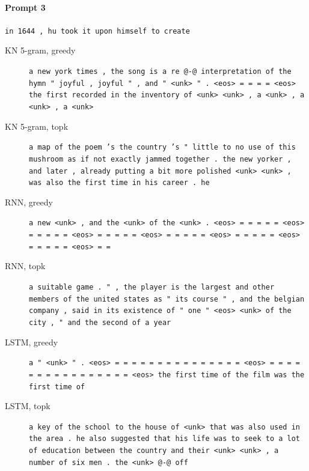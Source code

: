 \paragraph{Prompt 3} \texttt{in 1644 , hu took it upon himself to create}
\begin{description}
\item[KN 5-gram, greedy] \texttt{\small a new york times , the song is a re @-@ interpretation of the hymn " joyful , joyful " , and " \textless{}unk\textgreater{} " . \textless{}eos\textgreater{} = = = = \textless{}eos\textgreater{} the first recorded in the inventory of \textless{}unk\textgreater{} \textless{}unk\textgreater{} , a \textless{}unk\textgreater{} , a \textless{}unk\textgreater{} , a \textless{}unk\textgreater{}}
\item[KN 5-gram, topk] \texttt{\small a map of the poem 's the country 's " little to no use of this mushroom as if not exactly jammed together . the new yorker , and later , already putting a bit more polished \textless{}unk\textgreater{} \textless{}unk\textgreater{} , was also the first time in his career . he}
\item[RNN, greedy] \texttt{\small a new \textless{}unk\textgreater{} , and the \textless{}unk\textgreater{} of the \textless{}unk\textgreater{} . \textless{}eos\textgreater{} = = = = = \textless{}eos\textgreater{} = = = = = \textless{}eos\textgreater{} = = = = = \textless{}eos\textgreater{} = = = = = \textless{}eos\textgreater{} = = = = = \textless{}eos\textgreater{} = = = = = \textless{}eos\textgreater{} = =}
\item[RNN, topk] \texttt{\small a suitable game . " , the player is the largest and other members of the united states as " its course " , and the belgian company , said in its existence of " one " \textless{}eos\textgreater{} \textless{}unk\textgreater{} of the city , " and the second of a year}
\item[LSTM, greedy] \texttt{\small a " \textless{}unk\textgreater{} " . \textless{}eos\textgreater{} = = = = = = = = = = = = = = = \textless{}eos\textgreater{} = = = = = = = = = = = = = = = = \textless{}eos\textgreater{} the first time of the film was the first time of}
\item[LSTM, topk] \texttt{\small a key of the school to the house of \textless{}unk\textgreater{} that was also used in the area . he also suggested that his life was to seek to a lot of education between the country and their \textless{}unk\textgreater{} \textless{}unk\textgreater{} , a number of six men . the \textless{}unk\textgreater{} @-@ off}

\end{description}
